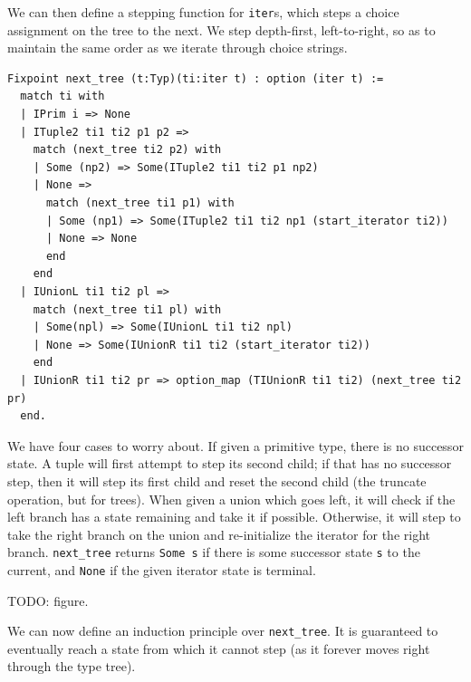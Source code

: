 \documentclass[a4paper,english]{lipics-v2019}
\begin{document}
We can then define a stepping function for \verb|iter|s, which
steps a choice assignment on the tree to the next. We step depth-first,
left-to-right, so as to maintain the same order as we iterate through 
choice strings.

\begin{verbatim}
Fixpoint next_tree (t:Typ)(ti:iter t) : option (iter t) :=
  match ti with
  | IPrim i => None
  | ITuple2 ti1 ti2 p1 p2 =>
    match (next_tree ti2 p2) with
    | Some (np2) => Some(ITuple2 ti1 ti2 p1 np2)
    | None =>
      match (next_tree ti1 p1) with
      | Some (np1) => Some(ITuple2 ti1 ti2 np1 (start_iterator ti2))
      | None => None
      end
    end
  | IUnionL ti1 ti2 pl =>
    match (next_tree ti1 pl) with
    | Some(npl) => Some(IUnionL ti1 ti2 npl)
    | None => Some(IUnionR ti1 ti2 (start_iterator ti2))
    end
  | IUnionR ti1 ti2 pr => option_map (TIUnionR ti1 ti2) (next_tree ti2 pr)
  end.
\end{verbatim}

We have four cases to worry about. If given a primitive type, there is no
successor state. A tuple will first attempt to step its second child; if  that
has no successor step, then it will step its first child and reset the second
child (the truncate operation, but for trees). When given a union which goes
left, it will check if the left branch has a state remaining and take it if
possible. Otherwise, it will step to take the right branch on the union and
re-initialize the iterator for the right branch. \verb|next_tree| returns
\verb|Some s| if there is some successor state \verb|s| to the current, and
\verb|None| if the given iterator state is terminal.

TODO: figure.

We can now define an induction principle over \verb|next_tree|. It is guaranteed
to eventually reach a state from which it cannot step (as it forever moves right
through the type tree). 
\end{document}
